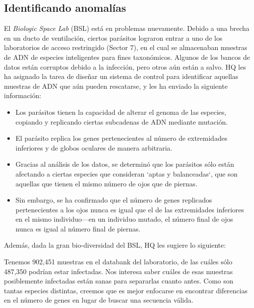 \documentclass[8pt, onside]{article}
\begin{document}
\subsection*{Identificando anomalías}

El \textit{Biologic Space Lab} (BSL) está en problemas nuevamente.
Debido a una brecha en un ducto de ventilación, ciertos parásitos lograron entrar a uno de los laboratorios de acceso restringido (Sector 7), en el cual se almacenaban muestras de ADN de especies inteligentes para fines taxonómicos.
Algunos de los bancos de datos están corruptos debido a la infección, pero otros aún están a salvo.
HQ les ha asignado la tarea de diseñar un sistema de control para identificar aquellas muestras de ADN que aún pueden rescatarse, y les ha enviado la siguiente información:

\begin{itemize}
    \itemsep0em
    \item Los parásitos tienen la capacidad de alterar el genoma de las especies, copiando y replicando ciertas subcadenas de ADN mediante mutación.
    \item El parásito replica los genes pertenecientes al número de extremidades inferiores y de globos oculares de manera arbitraria.
    \item Gracias al análisis de los datos, se determinó que los parásitos sólo están afectando a ciertas especies que consideran `aptas y balanceadas`, que son aquellas que tienen el mismo número de ojos que de piernas.
    \item Sin embargo, se ha confirmado que el número de genes replicados pertenecientes a los ojos nunca es igual que el de las extremidades inferiores en el mismo individuo---en un individuo mutado, el número final de ojos nunca es igual al número final de piernas.
\end{itemize}

Además, dada la gran bio-diversidad del BSL, HQ les sugiere lo siguiente:

\begin{tcolorbox}
{\small Tenemos 902,451 muestras en el databank del laboratorio, de las cuáles sólo 487,350 podrían estar infectadas.
Nos interesa saber cuáles de esas muestras posiblemente infectadas están sanas para separarlas cuanto antes.
Como son tantas especies distintas, creemos que es mejor enfocarse en encontrar diferencias en el número de genes en lugar de buscar una secuencia válida.}
\end{tcolorbox}
\end{document}
